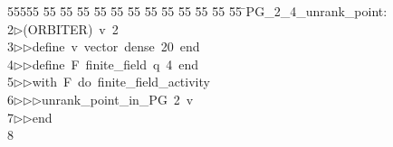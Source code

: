 %
%
\begin{tabbing}
55555 \= 55 \= 55 \= 55 \= 55 \= 55 \= 55 \= 55 \= 55 \= 55 \= 55 \= 55 \= 55 \= \>PG\_2\_4\_unrank\_point:\\[0pt]
2\>$\triangleright$\>(ORBITER)\ v\ 2\ \\[0pt]
3\>$\triangleright$\>$\triangleright$\>define\ v\ vector\ dense\ 20\ end\ \\[0pt]
4\>$\triangleright$\>$\triangleright$\>define\ F\ finite\_field\ q\ 4\ end\ \\[0pt]
5\>$\triangleright$\>$\triangleright$\>with\ F\ do\ finite\_field\_activity\ \\[0pt]
6\>$\triangleright$\>$\triangleright$\>$\triangleright$\>unrank\_point\_in\_PG\ 2\ v\ \\[0pt]
7\>$\triangleright$\>$\triangleright$\>end\\[0pt]
8\>\end{tabbing}
